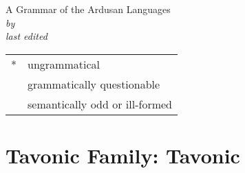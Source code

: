 \documentclass[12pt,letterpaper,openany,twoside]{memoir}
\title{\landn}
\author{Ian A.~Cook}
\date{\today}
\makeatletter
\let\originalpart=\part
\def\part{\cleardoublepage\originalpart}
\newcommand{\ungr}{*}
\newcommand{\ques}{\fakesuperscript{?}}
\newcommand{\excl}{\fakesuperscript{!}}
\newcommand{\landadj}{Ardusan}
\newcommand{\subtitle}{A Grammar of the \landadj{} Languages}
\newcommand{\Titlep}{%
	\begingroup
	\centering
	{\Huge \@title}\\[\baselineskip]
	{\Huge \scr{\@title}}\\[\baselineskip]
	{\LARGE\textsc \subtitle{}}\\[\baselineskip]
	{\Large\textit{by \@author}}\\
	\vfill
	\textit{last edited}\\
	{\large \@date}\par
	\endgroup
}
\makeatother
\begin{document}

\begin{titlingpage}
	\Titlep{}
	\clearpage
	
\end{titlingpage}


\frontmatter
{}\label{cha:toc}
\tableofcontents*
\clearpage
\listoffigures\label{cha:figures}
\clearpage
\listoftables\label{cha:tables}
\clearpage
\printglosses\label{cha:glossary}
\bigskip
\noindent\begin{tabular}{@{} l l}
\ungr & ungrammatical\\
\ques & grammatically questionable\\
\excl & semantically odd or ill-formed\\
\end{tabular}
\clearpage








\mainmatter

\part{Tavonic Family: Tavonic}
















\end{document}
